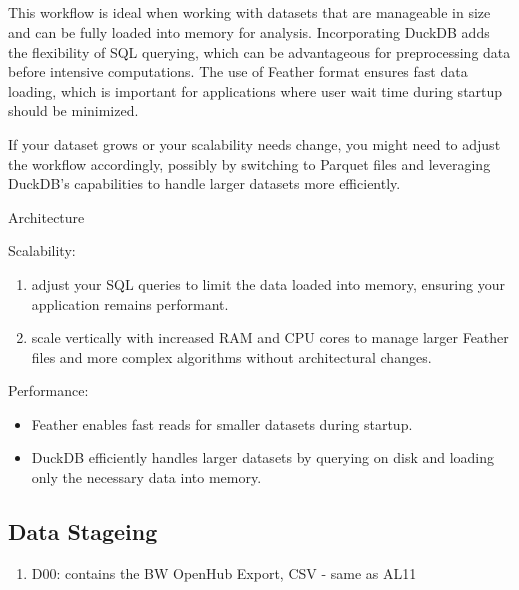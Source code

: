 \documentclass[
  american,
  10,
  a4paper,
]{book}
\providecommand{\tightlist}{%
  \setlength{\itemsep}{0pt}\setlength{\parskip}{0pt}}
\theoremstyle{definition}
\theoremstyle{remark}
\begin{document}
\subsection{}\label{section}

This workflow is ideal when working with datasets that are manageable in
size and can be fully loaded into memory for analysis. Incorporating
DuckDB adds the flexibility of SQL querying, which can be advantageous
for preprocessing data before intensive computations. The use of Feather
format ensures fast data loading, which is important for applications
where user wait time during startup should be minimized.

If your dataset grows or your scalability needs change, you might need
to adjust the workflow accordingly, possibly by switching to Parquet
files and leveraging DuckDB's capabilities to handle larger datasets
more efficiently.

Architecture

Scalability:

\begin{enumerate}
\def\labelenumi{\arabic{enumi}.}
\item
  adjust your SQL queries to limit the data loaded into memory, ensuring
  your application remains performant.
\item
  scale vertically with increased RAM and CPU cores to manage larger
  Feather files and more complex algorithms without architectural
  changes.
\end{enumerate}

Performance:

\begin{itemize}
\tightlist
\item
  Feather enables fast reads for smaller datasets during startup.
\item
  DuckDB efficiently handles larger datasets by querying on disk and
  loading only the necessary data into memory.
\end{itemize}

\subsection{Data Stageing}\label{data-stageing}

\begin{enumerate}
\def\labelenumi{\arabic{enumi}.}
\tightlist
\item
  D00: contains the BW OpenHub Export, CSV - same as AL11
\end{enumerate}
\end{document}
